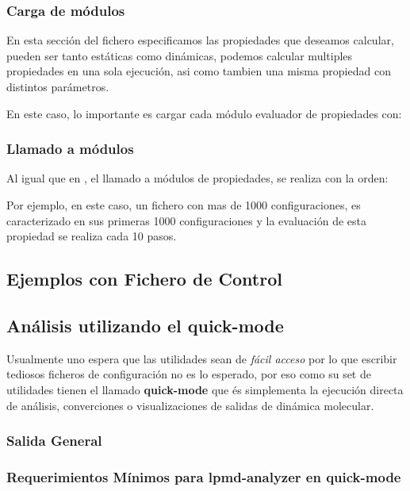 \subsubsection{Carga de m\'odulos}
En esta secci\'on del fichero especificamos las propiedades que deseamos calcular, pueden ser tanto est\'aticas como din\'amicas, podemos calcular multiples propiedades en una sola ejecuci\'on, asi como tambien una misma propiedad con distintos par\'ametros.

En este caso, lo importante es cargar cada m\'odulo evaluador de propiedades con:

\subsubsection{Llamado a m\'odulos}
Al igual que en {\lpmd}, el llamado a m\'odulos de propiedades, se realiza con la orden:


Por ejemplo, en este caso, un fichero con mas de 1000 configuraciones, es caracterizado en sus primeras 1000 configuraciones y la evaluaci\'on de esta propiedad se realiza cada 10 pasos.

\subsection{Ejemplos con Fichero de Control}

\subsection{An\'alisis utilizando el quick-mode}

Usualmente uno espera que las utilidades sean de \textit{f\'acil acceso} por lo que escribir tediosos ficheros de configuraci\'on no es lo esperado, por eso {\lpmd} como su set de utilidades tienen el llamado \textbf{quick-mode} que \'es simplementa la ejecuci\'on directa de an\'alisis, converciones o visualizaciones de salidas de din\'amica molecular.

\subsubsection{Salida General}

\subsubsection{Requerimientos M\'inimos para lpmd-analyzer en quick-mode}

